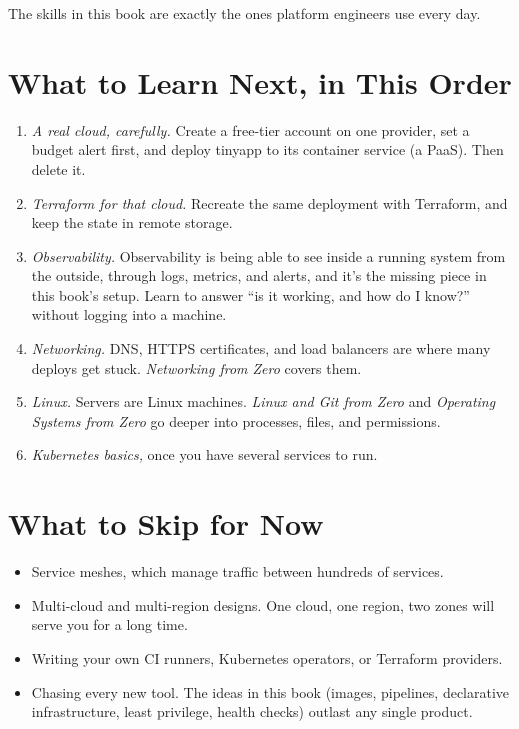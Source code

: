 The skills in this book are exactly the ones platform engineers use every day.

\section{What to Learn Next, in This Order}\label{13-where-to-go-from-here:what-to-learn-next-in-this-order}

\begin{enumerate}
\def\labelenumi{\arabic{enumi}.}
\tightlist
\item
  \emph{A real cloud, carefully.} Create a free-tier account on one provider, set a budget alert first, and deploy tinyapp to its container service (a PaaS). Then delete it.
\item
  \emph{Terraform for that cloud.} Recreate the same deployment with Terraform, and keep the state in remote storage.
\item
  \emph{Observability.} Observability is being able to see inside a running system from the outside, through logs, metrics, and alerts, and it's the missing piece in this book's setup. Learn to answer ``is it working, and how do I know?'' without logging into a machine.
\item
  \emph{Networking.} DNS, HTTPS certificates, and load balancers are where many deploys get stuck. \emph{Networking from Zero} covers them.
\item
  \emph{Linux.} Servers are Linux machines. \emph{Linux and Git from Zero} and \emph{Operating Systems from Zero} go deeper into processes, files, and permissions.
\item
  \emph{Kubernetes basics,} once you have several services to run.
\end{enumerate}

\section{What to Skip for Now}\label{13-where-to-go-from-here:what-to-skip-for-now}

\begin{itemize}
\tightlist
\item
  Service meshes, which manage traffic between hundreds of services.
\item
  Multi-cloud and multi-region designs. One cloud, one region, two zones will serve you for a long time.
\item
  Writing your own CI runners, Kubernetes operators, or Terraform providers.
\item
  Chasing every new tool. The ideas in this book (images, pipelines, declarative infrastructure, least privilege, health checks) outlast any single product.
\end{itemize}

